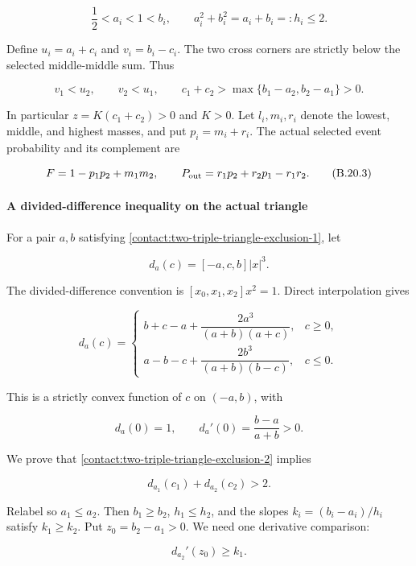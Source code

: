 \[
 \frac12<a_i<1<b_i,\qquad
 a_i^2+b_i^2=a_i+b_i=:h_i\leq2.
\tag{B.20.1}\label{contact:two-triple-triangle-exclusion-1}
\]

Define $u_i=a_i+c_i$ and $v_i=b_i-c_i$. The two cross corners are
strictly below the selected middle-middle sum. Thus

\[
 v_1<u_2,\qquad v_2<u_1,
 \qquad
 c_1+c_2>\max\{b_1-a_2,b_2-a_1\}>0.
\tag{B.20.2}\label{contact:two-triple-triangle-exclusion-2}
\]

In particular $z=K(c_1+c_2)>0$ and $K>0$. Let $l_i,m_i,r_i$
denote the lowest, middle, and highest masses, and put $p_i=m_i+r_i$.
The actual selected event probability and its complement are

\[
 F=1-p_1p_2+m_1m_2,\qquad
 P_{\rm out}=r_1p_2+r_2p_1-r_1r_2.
\tag{B.20.3}\label{contact:two-triple-triangle-exclusion-3}
\]

\paragraph{A divided-difference inequality on the actual triangle}

For a pair $a,b$ satisfying \eqref{contact:two-triple-triangle-exclusion-1}, let

\[
 d_a(c)=[-a,c,b]|x|^3.
\]

The divided-difference convention is $[x_0,x_1,x_2]x^2=1$.
Direct interpolation gives

\[
 d_a(c)=
 \begin{cases}
 b+c-a+\dfrac{2a^3}{(a+b)(a+c)},&c\geq0,\\[4pt]
 a-b-c+\dfrac{2b^3}{(a+b)(b-c)},&c\leq0.
 \end{cases}
\tag{B.20.4}\label{contact:two-triple-triangle-exclusion-4}
\]

This is a strictly convex function of $c$ on $(-a,b)$, with

\[
 d_a(0)=1,\qquad d_a'(0)=\frac{b-a}{a+b}>0.
\tag{B.20.5}\label{contact:two-triple-triangle-exclusion-5}
\]

We prove that \eqref{contact:two-triple-triangle-exclusion-2} implies

\[
 \boxed{\quad d_{a_1}(c_1)+d_{a_2}(c_2)>2.\quad}
\tag{B.20.6}\label{contact:two-triple-triangle-exclusion-6}
\]

Relabel so $a_1\le a_2$. Then $b_1\ge b_2$, $h_1\le h_2$, and the
slopes $k_i=(b_i-a_i)/h_i$ satisfy $k_1\ge k_2$. Put
$z_0=b_2-a_1>0$. We need one derivative comparison:

\[
 d_{a_2}'(z_0)\geq k_1.
\tag{B.20.7}\label{contact:two-triple-triangle-exclusion-7}
\]

